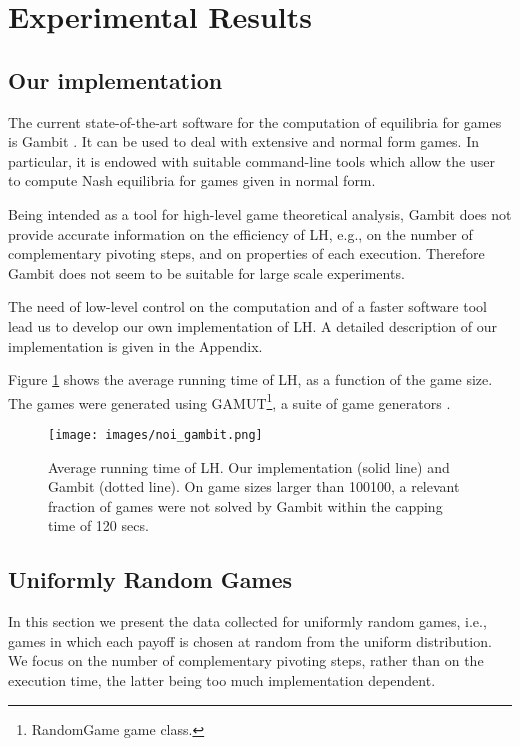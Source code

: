 \documentclass[11pt]{article}
\begin{document}
\section{Experimental Results}
\label{expres}

\subsection{Our implementation}
The current state-of-the-art software for the computation of
equilibria for games is Gambit \cite{gamb}. It can be used to deal
with extensive and normal form games. In particular, it is endowed
with suitable command-line tools which allow the user to compute
Nash equilibria for games given in normal form.

Being intended as a tool for high-level game theoretical analysis,
Gambit does not provide accurate information on the efficiency of
LH, e.g., on the number of complementary pivoting steps, and on
properties of each execution. Therefore Gambit does not seem to be
suitable for large scale experiments.

The need of low-level control on the computation and of a faster
software tool lead us to develop our own implementation of LH. A
detailed description of our implementation is given in the Appendix.

Figure \ref{noi_gambit} shows the average running time of LH, 
as a function of the game size. The games were
generated using GAMUT\footnote{RandomGame game class.}, a suite of game generators \cite{gamut}.

\begin{figure}[h]
\centering
\texttt{[image: images/noi\_gambit.png]}
\caption{Average running time of LH. Our
implementation (solid line) and Gambit (dotted line). On game sizes larger
than 100100, a relevant fraction of games were not solved by Gambit
within the capping time of 120 secs.}
\label{noi_gambit}
\end{figure}

\subsection{Uniformly Random Games}

In this section we present the data collected for uniformly
random games, i.e., games in which each payoff is chosen at random
from the uniform distribution.
We focus on the number of complementary pivoting steps,
rather than on the execution time, the latter being too much
implementation dependent.
\end{document}
